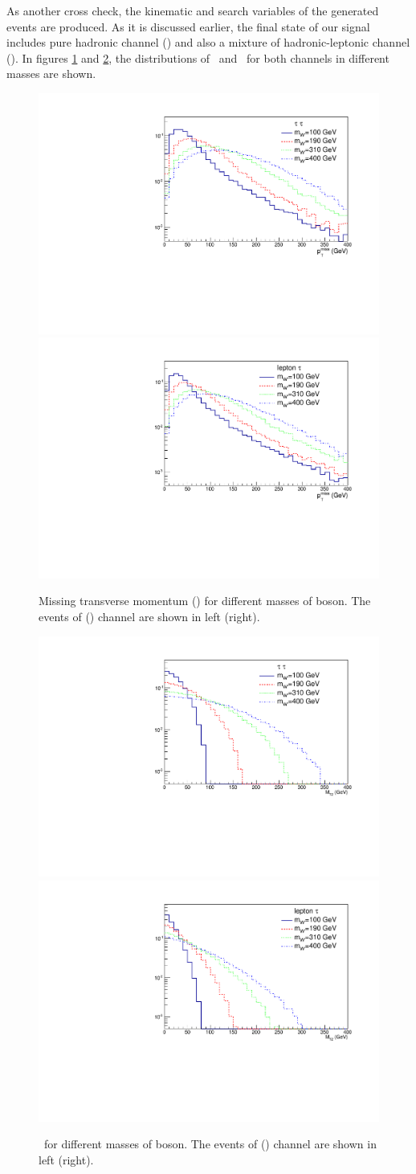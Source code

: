 As another cross check, the kinematic  and search  variables of the generated events are produced. As it is discussed earlier, the final state of our signal includes pure hadronic channel (\tauTau) and also a mixture of hadronic-leptonic channel (\lepTau ).  In figures \ref{fig:met} and \ref{fig:mt2}, the distributions of \mttwo ~and \MET ~for both channels in different \wprime masses are shown.
\begin{figure}[htb]
	\centering
	\includegraphics*[width=.45\textwidth]{figs/MET_hh.pdf}
	\hspace{3mm}
	\includegraphics*[width=.45\textwidth]{figs/MET_lh.pdf}
	\caption{Missing transverse momentum (\MET) for different masses of \wprime boson. The events of \tauTau(\lepTau) channel are shown in left (right).}
	\label{fig:met}
\end{figure}
\begin{figure}[htb]
	\centering
	\includegraphics*[width=.45\textwidth]{figs/MT2_hh.pdf}
	\hspace{3mm}
	\includegraphics*[width=.45\textwidth]{figs/MT2_lh.pdf}
	\caption{\mttwo ~for different masses of \wprime boson. The events of \tauTau (\lepTau) channel are shown in left (right).}
	\label{fig:mt2}
\end{figure} 
